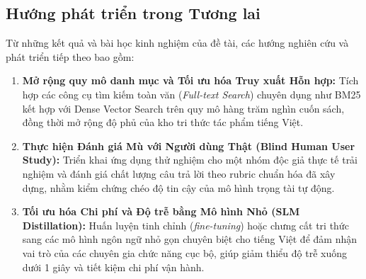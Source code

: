 \subsection{Hướng phát triển trong Tương lai}
Từ những kết quả và bài học kinh nghiệm của đề tài, các hướng nghiên cứu và phát triển tiếp theo bao gồm:
\begin{enumerate}
    \item \textbf{Mở rộng quy mô danh mục và Tối ưu hóa Truy xuất Hỗn hợp:} Tích hợp các công cụ tìm kiếm toàn văn (\textit{Full-text Search}) chuyên dụng như BM25 kết hợp với Dense Vector Search trên quy mô hàng trăm nghìn cuốn sách, đồng thời mở rộng độ phủ của kho tri thức tác phẩm tiếng Việt.
    \item \textbf{Thực hiện Đánh giá Mù với Người dùng Thật (Blind Human User Study):} Triển khai ứng dụng thử nghiệm cho một nhóm độc giả thực tế trải nghiệm và đánh giá chất lượng câu trả lời theo rubric chuẩn hóa đã xây dựng, nhằm kiểm chứng chéo độ tin cậy của mô hình trọng tài tự động.
    \item \textbf{Tối ưu hóa Chi phí và Độ trễ bằng Mô hình Nhỏ (SLM Distillation):} Huấn luyện tinh chỉnh (\textit{fine-tuning}) hoặc chưng cất tri thức sang các mô hình ngôn ngữ nhỏ gọn chuyên biệt cho tiếng Việt để đảm nhận vai trò của các chuyên gia chức năng cục bộ, giúp giảm thiểu độ trễ xuống dưới 1 giây và tiết kiệm chi phí vận hành.
\end{enumerate}
